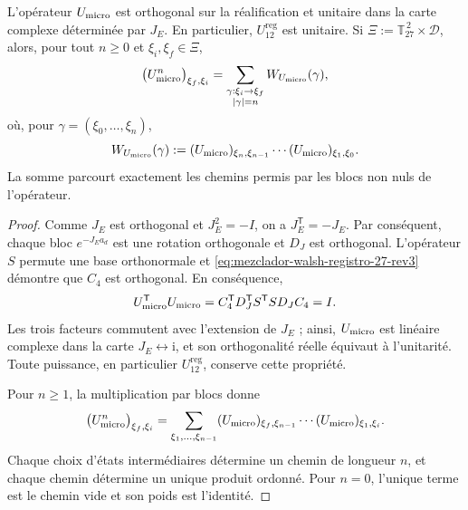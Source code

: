 \begin{proposition}
\label{prop:unitariedad-suma-registro-27-rev3}
L'opérateur \(U_{\rm micro}\) est orthogonal sur la réalification et unitaire dans la carte complexe déterminée par \(J_E\). En particulier, \(U_{12}^{\mathrm{reg}}\) est unitaire. Si \(\Xi:=\mathbb T_{27}^{\,2}\times\mathcal D\), alors, pour tout \(n\geq0\) et \(\xi_i,\xi_f\in\Xi\),
\[
 \bigl(U_{\rm micro}^{n}\bigr)_{\xi_f,\xi_i}
 =
 \sum_{\substack{\gamma:\xi_i\to\xi_f\\|\gamma|=n}}
 W_{U_{\rm micro}}(\gamma),
\]
où, pour \(\gamma=(\xi_0,\ldots,\xi_n)\),
\[
 W_{U_{\rm micro}}(\gamma)
 :=
 (U_{\rm micro})_{\xi_n,\xi_{n-1}}
 \cdots
 (U_{\rm micro})_{\xi_1,\xi_0}.
\]
La somme parcourt exactement les chemins permis par les blocs non nuls
de l’opérateur.
\end{proposition}

\begin{proof}
Comme \(J_E\) est orthogonal et \(J_E^2=-I\), on a
\(J_E^{\mathsf T}=-J_E\). Par conséquent, chaque bloc
\(e^{-J_Ea_d}\) est une rotation orthogonale et \(D_J\) est orthogonal.
L’opérateur \(S\) permute une base orthonormale et
\eqref{eq:mezclador-walsh-registro-27-rev3} démontre que \(C_4\) est
orthogonal. En conséquence,
\[
 U_{\rm micro}^{\mathsf T}U_{\rm micro}
 =C_4^{\mathsf T}D_J^{\mathsf T}S^{\mathsf T}
   S D_JC_4
 =I.
\]
Les trois facteurs commutent avec l’extension de \(J_E\) ; ainsi,
\(U_{\rm micro}\) est linéaire complexe dans la carte
\(J_E\leftrightarrow\mathrm i\), et son orthogonalité réelle équivaut à
l’unitarité. Toute puissance, en particulier
\(U_{12}^{\mathrm{reg}}\), conserve cette propriété.


Pour \(n\geq1\), la multiplication par blocs donne
\[
 \bigl(U_{\rm micro}^{n}\bigr)_{\xi_f,\xi_i}
 =
 \sum_{\xi_1,\ldots,\xi_{n-1}}
 (U_{\rm micro})_{\xi_f,\xi_{n-1}}
 \cdots
 (U_{\rm micro})_{\xi_1,\xi_i}.
\]
Chaque choix d'états intermédiaires détermine un chemin de longueur \(n\), et chaque chemin détermine un unique produit ordonné. Pour \(n=0\), l'unique terme est le chemin vide et son poids est l'identité.
\end{proof}

